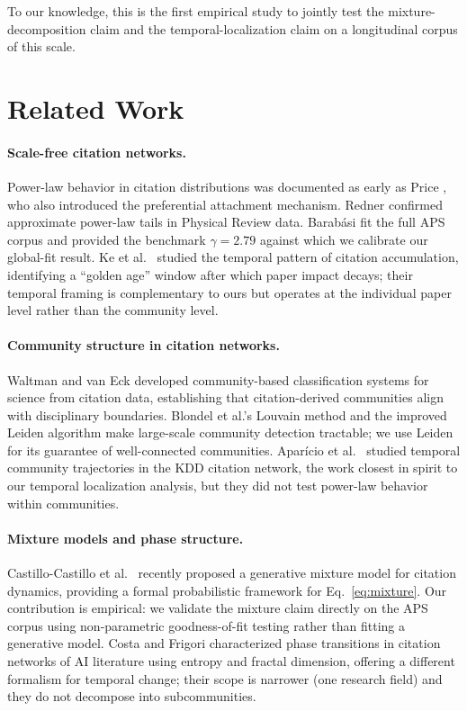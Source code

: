 \documentclass[runningheads]{llncs}
\begin{document}
To our knowledge, this is the first empirical study to jointly test the
mixture-decomposition claim and the temporal-localization claim on a
longitudinal corpus of this scale.


\section{Related Work}
\label{sec:related}

\paragraph{Scale-free citation networks.}
Power-law behavior in citation distributions was documented as early as
Price \cite{Price1965,Price1976}, who also introduced the preferential
attachment mechanism.  Redner \cite{Redner1998} confirmed approximate power-law
tails in Physical Review data.  Barab{\'a}si \cite{Barabasi2016} fit the full
APS corpus and provided the benchmark $\gamma = 2.79$ against which we
calibrate our global-fit result.  Ke et al.\ \cite{Ke2023} studied the temporal
pattern of citation accumulation, identifying a ``golden age'' window after
which paper impact decays; their temporal framing is complementary to ours but
operates at the individual paper level rather than the community level.

\paragraph{Community structure in citation networks.}
Waltman and van Eck \cite{Waltman2012} developed community-based classification
systems for science from citation data, establishing that citation-derived
communities align with disciplinary boundaries.  Blondel et al.'s Louvain
method \cite{BlondelLouvain2008} and the improved Leiden algorithm
\cite{Traag2019} make large-scale community detection tractable; we use Leiden
for its guarantee of well-connected communities.  Apar{\'i}cio et al.\
\cite{Aparicio2024} studied temporal community trajectories in the KDD citation
network, the work closest in spirit to our temporal localization analysis, but
they did not test power-law behavior within communities.

\paragraph{Mixture models and phase structure.}
Castillo-Castillo et al.\ \cite{CastilloCastillo2025} recently proposed a
generative mixture model for citation dynamics, providing a formal probabilistic
framework for Eq.~\eqref{eq:mixture}.  Our contribution is empirical: we
validate the mixture claim directly on the APS corpus using non-parametric
goodness-of-fit testing rather than fitting a generative model.  Costa and
Frigori \cite{CostaFrigori2024} characterized phase transitions in citation
networks of AI literature using entropy and fractal dimension, offering a
different formalism for temporal change; their scope is narrower (one research
field) and they do not decompose into subcommunities.
\end{document}

